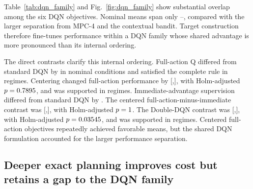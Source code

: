 \documentclass[11pt]{article}
\begin{document}
\color{red}%
Table~\ref{tab:dqn_family} and Fig.~\ref{fig:dqn_family} show substantial overlap among the six DQN objectives. Nominal means span only \DQNFamilyNominalMinCost--\DQNFamilyNominalMaxCost, compared with the larger separation from MPC-4 and the contextual bandit. Target construction therefore fine-tunes performance within a DQN family whose shared advantage is more pronounced than its internal ordering.

The direct contrasts clarify this internal ordering. Full-action Q differed from standard DQN by \FullQDifference{} in nominal conditions and satisfied the complete rule in \FullQSupportedCount{} regimes. Centering changed full-action performance by \CenteredDifference{} [\CenteredCILow,\CenteredCIHigh], with Holm-adjusted $p=0.7895$, and was supported in \CenteredSupportedCount{} regimes. Immediate-advantage supervision differed from standard DQN by \ImmediateDifference. The centered full-action-minus-immediate contrast was \BootstrapDifference{} [\BootstrapCILow,\BootstrapCIHigh], with Holm-adjusted $p=1$. The Double-DQN contrast was \DoubleDifference{} [\DoubleCILow,\DoubleCIHigh], with Holm-adjusted $p=0.03545$, and was supported in \DoubleSupportedCount{} regimes. Centered full-action objectives repeatedly achieved favorable means, but the shared DQN formulation accounted for the larger performance separation.

\subsection{Deeper exact planning improves cost but retains a gap to the DQN family}
\color{black}%

\begin{table}[H]
\centering
\color{red}%
\caption{Nominal receding-horizon planning over 400 unique held-out traces. Each planner has perfect knowledge of the next $H$ tasks and exogenous link states and exactly enumerates $3^H$ sequences before every action. Runtime was measured on the same workstation and includes only planner action selection after environment construction. DQN inference time was not benchmarked in this experiment, so the table is not a matched deployment-latency comparison.}
\color{black}%
\label{tab:planner_depth}
\resizebox{0.85\textwidth}{!}{}
\end{table}
\end{document}
